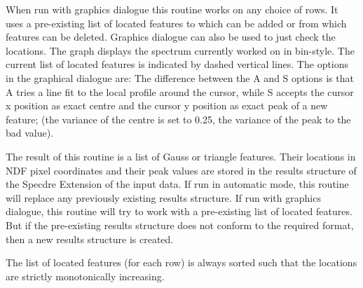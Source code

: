 {{      When run with graphics dialogue this routine works on any choice
      of rows. It uses a pre-existing list of located features to which
      can be added or from which features can be deleted. Graphics
      dialogue can also be used to just check the locations. The graph
      displays the spectrum currently worked on in bin-style. The current
      list of located features is indicated by dashed vertical lines.
      The options in the graphical dialogue are:
      The difference between the A and S options is that A tries a line
      fit to the local profile around the cursor, while S accepts the
      cursor x position as exact centre and the cursor y position as
      exact peak of a new feature; (the variance of the centre is set
      to 0.25, the variance of the peak to the bad value).

      The result of this routine is a list of Gauss or triangle
      features. Their locations in NDF pixel coordinates and their peak
      values are stored in the results structure of the Specdre
      Extension of the input data. If run in automatic mode, this
      routine will replace any previously existing results structure. If
      run with graphics dialogue, this routine will try to work with a
      pre-existing list of located features. But if the pre-existing
      results structure does not conform to the required format, then a
      new results structure is created.

      The list of located features (for each row) is always sorted such
      that the locations are strictly monotonically increasing.

}}
